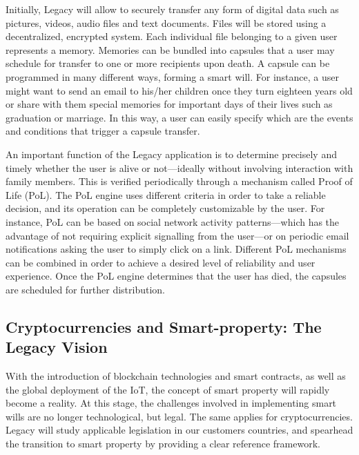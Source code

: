 Initially, Legacy will allow to securely transfer any form of digital data such as pictures, videos, audio files and text documents. Files will be stored using a decentralized, encrypted system. Each individual file belonging to a given user represents a memory. Memories can be bundled into capsules that a user may schedule for transfer to one or more recipients upon death. A capsule can be programmed in many different ways, forming a smart will. For instance, a user might want to send an email to his/her children once they turn eighteen years old or share with them special memories for important days of their lives such as graduation or marriage. In this way, a user can easily specify which are the events and conditions that trigger a capsule transfer.

An important function of the Legacy application is to determine precisely and timely whether the user is alive or not---ideally without involving interaction with family members. This is verified periodically through a mechanism called Proof of Life (PoL). The PoL engine uses different criteria in order to take a reliable decision, and its operation can be completely customizable by the user. For instance, PoL can be based on social network activity patterns---which has the advantage of not requiring explicit signalling from the user---or on periodic email notifications asking the user to simply click on a link. Different PoL mechanisms can be combined in order to achieve a desired level of reliability and user experience. Once the PoL engine determines that the user has died, the capsules are scheduled for further distribution.

\subsection{Cryptocurrencies and Smart-property: The Legacy Vision} %
\label{sub:cryptocurrencies_and_smart_property_the_legacy_vision}
With the introduction of blockchain technologies and smart contracts, as well as the global deployment of the IoT, the concept of smart property will rapidly become a reality.  At this stage, the challenges involved in implementing smart wills are no longer technological, but legal. The same applies for cryptocurrencies. Legacy will study applicable legislation in our customers countries, and spearhead the transition to smart property by providing a clear reference framework. 




